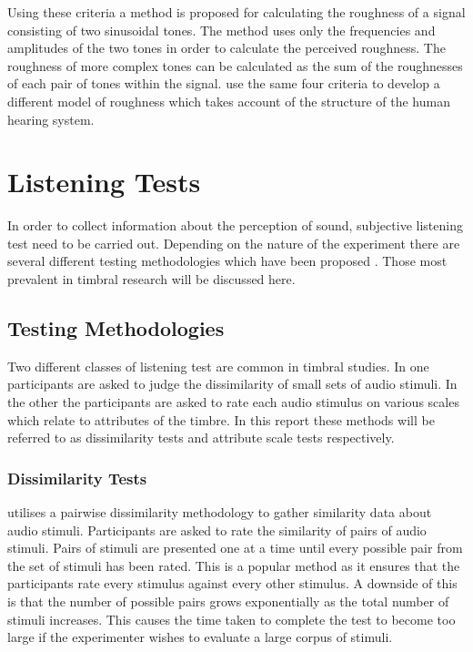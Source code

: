 		Using these criteria a method is proposed for calculating the roughness of a signal consisting of two
		sinusoidal tones. The method uses only the frequencies and amplitudes of the two tones in order to
		calculate the perceived roughness. The roughness of more complex tones can be calculated as the sum of the
		roughnesses of each pair of tones within the signal. \citet{fastl2007psychoacoustics} use the same four
		criteria to develop a different model of roughness which takes account of the structure of the human
		hearing system.

\section{Listening Tests}
\label{sec:Timbre-ListeningTests}
	In order to collect information about the perception of sound, subjective listening test need to be carried out.
	Depending on the nature of the experiment there are several different testing methodologies which have been
	proposed \citep{bech2006perceptual}. Those most prevalent in timbral research will be discussed here.

	\subsection{Testing Methodologies}
	\label{sec:Timbre-ListeningTests-Methods}
		Two different classes of listening test are common in timbral studies. In one participants are asked to
		judge the dissimilarity of small sets of audio stimuli. In the other the participants are asked to rate
		each audio stimulus on various scales which relate to attributes of the timbre. In this report these
		methods will be referred to as dissimilarity tests and attribute scale tests respectively.

		\subsubsection*{Dissimilarity Tests}
			\citet{grey1977multidimensional} utilises a pairwise dissimilarity methodology to gather similarity
			data about audio stimuli. Participants are asked to rate the similarity of pairs of audio stimuli.
			Pairs of stimuli are presented one at a time until every possible pair from the set of stimuli has
			been rated. This is a popular method as it ensures that the participants rate every stimulus
			against every other stimulus. A downside of this is that the number of possible pairs grows
			exponentially as the total number of stimuli increases. This causes the time taken to complete the
			test to become too large if the experimenter wishes to evaluate a large corpus of stimuli.

